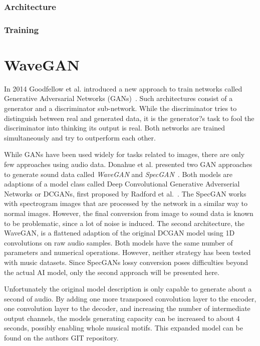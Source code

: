 \documentclass[12pt]{article}
\begin{document}

\subsubsection{Architecture}
\subsubsection{Training}









\section{WaveGAN}
In 2014 Goodfellow et al. introduced a new approach to train networks called Generative Adversarial Networks (GANs)~\cite{goodfellow2014generative}.
Such architectures consist of a generator and a discriminator sub-network.
While the discriminator tries to distinguish between real and generated data, it is the generator?s task to fool the discriminator into thinking its output is real.
Both networks are trained simultaneously and try to outperform each other.

While GANs have been used widely for tasks related to images, there are only few approaches using audio data.
Donahue et al. presented two GAN approaches to generate sound data called \emph{WaveGAN} and \emph{SpecGAN}~\cite{donahue2018adversarial}.
Both models are adaptions of a model class called Deep Convolutional Generative Adverserial Networks or DCGANs, first proposed by Radford et al.~\cite{radford2015unsupervised}.
The SpecGAN works with spectrogram images that are processed by the network in a similar way to normal images.
However, the final conversion from image to sound data is known to be problematic, since a lot of noise is induced.
The second architecture, the WaveGAN, is a flattened adaption of the original DCGAN model using 1D convolutions on raw audio samples.
Both models have the same number of parameters and numerical operations.
However, neither strategy has been tested with music datasets.
Since SpecGANs lossy conversion poses difficulties beyond the actual AI model, only the second approach will be presented here.

Unfortunately the original model description is only capable to generate about a second of audio.
By adding one more transposed convolution layer to the encoder, one convolution layer to the decoder, and increasing the number of intermediate output channels, the models generating capacity can be increased to about 4 seconds, possibly
enabling whole musical motifs. 
This expanded model can be found on the authors GIT repository\cite{donahue2019wavegan}.
\end{document}
